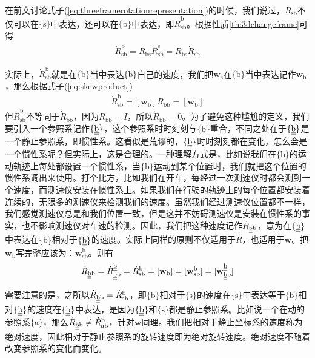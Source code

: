 \documentclass[12pt, a4paper, article, UTF8]{ctexart}
\begin{document}
在前文讨论式子(\ref{eq:threeframerotationrepresentation})的时候，我们说过，$\dot{R}_\text{sb}$不仅可以在$\{\text{s}\}$中表达，还可以在$\{\text{b}\}$中表达，即$\dot{R}_\text{sb}^{\text{b}}$。根据性质\ref{th:3dchangeframe}可得
\begin{align}
\dot{R}_\text{sb}^{\text{b}} = R_\text{bs} \dot{R}_\text{sb}^{\text{s}} = R_\text{bs} \dot{R}_\text{sb}
\end{align}

实际上，$\dot{R}_\text{sb}^{\text{b}}$就是在$\{\text{b}\}$当中表达$\{\text{b}\}$自己的速度，我们把$\mathbf{w}_\text{s}$在$\{\text{b}\}$当中表达记作$\mathbf{w}_\text{b}$，那么根据式子(\ref{eq:skewproduct})
\begin{align}
\dot{R}_\text{sb}^{\text{b}} = [\mathbf{w}_\text{b}]R_\text{bb} = [\mathbf{w}_\text{b}] \label{eq:computersbb}
\end{align}
但$\dot{R}_\text{sb}^{\text{b}}$不等同于$\dot{R}_\text{bb}$，因为$R_\text{bb}=I$，所以$\dot{R}_\text{bb}=0$。为了避免这种尴尬的定义，我们要引入一个参照系记作$\{\text{\underline{\underline{b}}}\}$，这个参照系时时刻刻与$\{\text{b}\}$重合，不同之处在于$\{\text{\underline{\underline{b}}}\}$是一个静止参照系，即惯性系。这看似是荒谬的，$\{\text{\underline{\underline{b}}}\}$时时刻刻都在变化，怎么会是一个惯性系呢？但实际上，这是合理的。一种理解方式是，比如说我们在$\{\text{b}\}$的运动轨迹上每处都设置一个惯性系，当$\{\text{b}\}$运动到某个位置时，我们就把这个位置的惯性系调出来使用。打个比方，比如我们在开车，每经过一次测速仪时都会测到一个速度，而测速仪安装在惯性系上。如果我们在行驶的轨迹上的每个位置都安装着连续的，无限多的测速仪来检测我们的速度。虽然我们经过测速仪位置都不一样，我们感觉测速仪总是和我们位置一致，但是这并不妨碍测速仪是安装在惯性系的事实，也不影响测速仪对车速的检测。因此，我们把这种速度记作$\dot{R}_\text{\underline{\underline{b}}b}$，意为在$\{\text{\underline{\underline{b}}}\}$中表达在$\{\text{b}\}$相对于$\{\text{\underline{\underline{b}}}\}$的速度。实际上同样的原则不仅适用于$\dot{R}$，也适用于$\mathbf{w}$。把$\mathbf{w}_\text{b}$写完整应该为：$\mathbf{w}_\text{sb}^{\text{b}}$。则有
\begin{align}
\dot{R}_\text{\underline{\underline{b}}b} =\dot{R}_\text{\underline{\underline{b}}b}^{\text{\underline{\underline{b}}}} =  \dot{R}_\text{sb}^{\text{b}} = [\mathbf{w}_\text{b}] = [\mathbf{w}_\text{sb}^{\text{b}}] = [\mathbf{w}_\text{\underline{\underline{b}}b}^{\text{\underline{\underline{b}}}}]
\end{align}

需要注意的是，之所以$\dot{R}_\text{\underline{\underline{b}}b} =  \dot{R}_\text{sb}^{\text{b}}$，即$\{\text{b}\}$相对于$\{\text{s}\}$的速度在$\{\text{s}\}$中表达等于$\{\text{b}\}$相对$\{\text{\underline{\underline{b}}}\}$的速度在$\{\text{\underline{\underline{b}}}\}$中表达，是因为$\{\text{\underline{\underline{b}}}\}$和$\{\text{s}\}$都是静止参照系。比如说一个在动的参照系$\{\text{a}\}$，那么$\dot{R}_\text{\underline{\underline{b}}b}\neq \dot{R}_\text{ab}^{\text{b}}$，针对$\mathbf{w}$同理。我们把相对于静止坐标系的速度称为绝对速度，因此相对于静止参照系的旋转速度即为绝对旋转速度。绝对速度不随着改变参照系的变化而变化。
\end{document}
